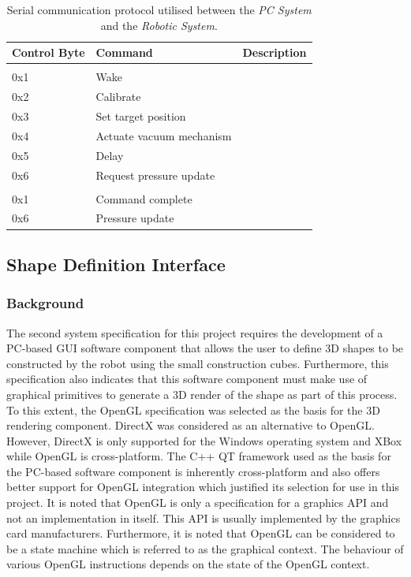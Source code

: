 \begin{table}[H]
	\renewcommand{\arraystretch}{1.3}
	\centering
	\begin{tabular}{|>{\raggedright}m{1.5cm}|>{\raggedright}m{3cm}|>{\raggedright\arraybackslash}m{10cm}|}
		\hline
		\textbf{Control Byte} & \textbf{Command} & \textbf{Description} \\
		\hline
		\multicolumn{3}{|l|}{\textbf{\textit{PC System} to \textit{Robotic System}}} \\
		\hline
		0x1 & Wake & \\
		\hline
		0x2 & Calibrate & \\
		\hline
		0x3 & Set target position & \\
		\hline
		0x4 & Actuate vacuum mechanism & \\
		\hline
		0x5 & Delay & \\
		\hline
		0x6 & Request pressure update & \\
		\hline
		\multicolumn{3}{|l|}{\textbf{\textit{Robotic System} to \textit{PC System}}} \\
		\hline
		0x1 & Command complete & \\
		\hline
		0x6 & Pressure update & \\
		\hline
	\end{tabular}
	\caption{\label{tab:serial-communication-protocol}Serial communication protocol utilised between the \textit{PC System} and the \textit{Robotic System}.}
\end{table}

\subsection{Shape Definition Interface}

\subsubsection{Background}

The second system specification for this project requires the development of a PC-based GUI software component that allows the user to define 3D shapes to be constructed by the robot using the small construction cubes. Furthermore, this specification also indicates that this software component must make use of graphical primitives to generate a 3D render of the shape as part of this process. To this extent, the OpenGL specification was selected as the basis for the 3D rendering component. DirectX was considered as an alternative to OpenGL. However, DirectX is only supported for the Windows operating system and XBox while OpenGL is cross-platform. The C++ QT framework used as the basis for the PC-based software component is inherently cross-platform and also offers better support for OpenGL integration which justified its selection for use in this project. It is noted that OpenGL is only a specification for a graphics API and not an implementation in itself. This API is usually implemented by the graphics card manufacturers. Furthermore, it is noted that OpenGL can be considered to be a state machine which is referred to as the graphical context. The behaviour of various OpenGL instructions depends on the state of the OpenGL context.

